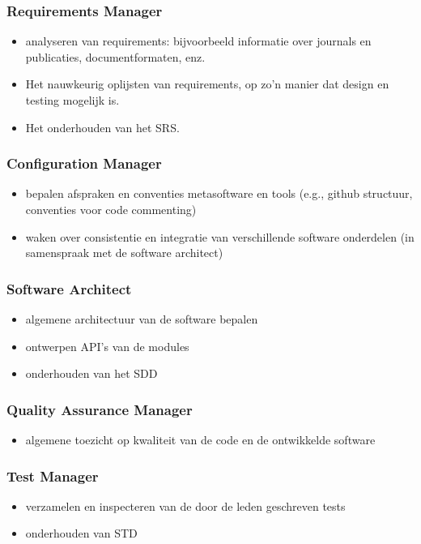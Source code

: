 \documentclass{article}
\begin{document}
\subsubsection*{Requirements Manager}
\begin{itemize}
\item analyseren van requirements: bijvoorbeeld informatie over journals en publicaties, documentformaten, enz. 
\item Het nauwkeurig oplijsten van requirements, op zo'n manier dat design en testing mogelijk is.
\item Het onderhouden van het SRS.
\end{itemize}

\subsubsection*{Configuration Manager}
\begin{itemize}
\item bepalen afspraken en conventies metasoftware en tools (e.g., github structuur, conventies voor code commenting) 
\item waken over consistentie en integratie van verschillende software onderdelen (in samenspraak met de software architect)
\end{itemize}

\subsubsection*{Software Architect}
\begin{itemize}
\item algemene architectuur van de software bepalen 
\item ontwerpen API's van de modules
\item onderhouden van het SDD
\end{itemize}


\subsubsection*{Quality Assurance Manager}
\begin{itemize}
\item algemene toezicht op kwaliteit van de code en de ontwikkelde software
\end{itemize}

\subsubsection*{Test Manager}
\begin{itemize}
\item verzamelen en inspecteren van de door de leden geschreven tests
\item onderhouden van STD
\end{itemize}
\end{document}
